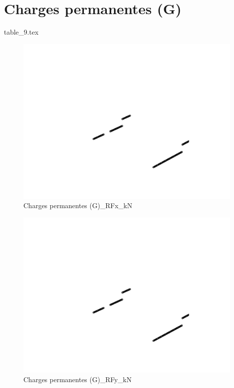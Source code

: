 
    \section{Charges permanentes (G)}
    {table_9.tex}

    \begin{figure}[H] %
        \centering %
        \includegraphics[width=\textwidth]{assets/img/graph3D_charges_cas_9_RFx_kN.png} %
        \caption{Charges permanentes (G)\_RFx\_kN} %
    \end{figure}

    \begin{figure}[H] %
        \centering %
        \includegraphics[width=\textwidth]{assets/img/graph3D_charges_cas_9_RFy_kN.png} %
        \caption{Charges permanentes (G)\_RFy\_kN} %
    \end{figure}

